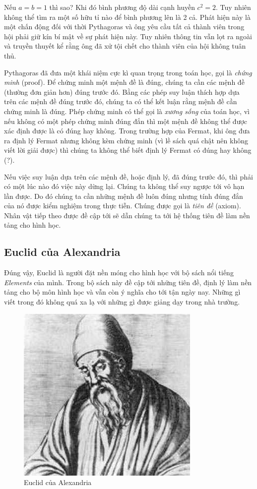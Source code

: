 Nếu $a = b = 1$ thì sao? Khi đó bình phương độ dài cạnh huyền $c^2 = 2$. Tuy nhiên không thể tìm ra một số hữu tỉ nào để bình phương lên là 2 cả. Phát hiện này là một chấn động đối với thời Pythagoras và ông yêu cầu tất cả thành viên trong hội phải giữ kín bí mật về sự phát hiện này. Tuy nhiên thông tin vẫn lọt ra ngoài và truyền thuyết kể rằng ông đã xử tội chết cho thành viên của hội không tuân thủ.

Pythagoras đã đưa một khái niệm cực kì quan trọng trong toán học, gọi là \textit{chứng minh} (proof). Để chứng minh một mệnh đề là đúng, chúng ta cần các mệnh đề (thường đơn giản hơn) đúng trước đó. Bằng các phép suy luận thích hợp dựa trên các mệnh đề đúng trước đó, chúng ta có thể kết luận rằng mệnh đề cần chứng minh là đúng. Phép chứng minh có thể gọi là \textit{xương sống} của toán học, vì nếu không có một phép chứng minh đúng đắn thì một mệnh đề không thể được xác định được là có đúng hay không. Trong trường hợp của Fermat, khi ông đưa ra định lý Fermat nhưng không kèm chứng minh (vì lề sách quá chật nên không viết lời giải được) thì chúng ta không thể biết định lý Fermat có đúng hay không (?).

Nếu việc suy luận dựa trên các mệnh đề, hoặc định lý, đã đúng trước đó, thì phải có một lúc nào đó việc này dừng lại. Chúng ta không thể suy ngược tới vô hạn lần được. Do đó chúng ta cần những mệnh đề luôn đúng nhưng tính đúng đắn của nó được kiểm nghiệm trong thực tiễn. Chúng được gọi là \textit{tiên đề} (axiom). Nhân vật tiếp theo được đề cập tới sẽ dẫn chúng ta tới hệ thống tiên đề làm nền tảng cho hình học.

\subsection*{Euclid của Alexandria}

Đúng vậy, Euclid là người đặt nền móng cho hình học với bộ sách nổi tiếng \textit{Elements} của mình. Trong bộ sách này đề cập tới những tiên đề, định lý làm nền tảng cho bộ môn hình học và vẫn còn ý nghĩa cho tới tận ngày nay. Những gì viết trong đó không quá xa lạ với những gì được giảng dạy trong nhà trường.

\begin{figure}[ht]
	\centering
	\includegraphics[scale=0.5]{analytic_geometry/Euclid.jpeg}
	\captionsetup{labelformat=empty}
	\caption{Euclid của Alexandria}
\end{figure}

